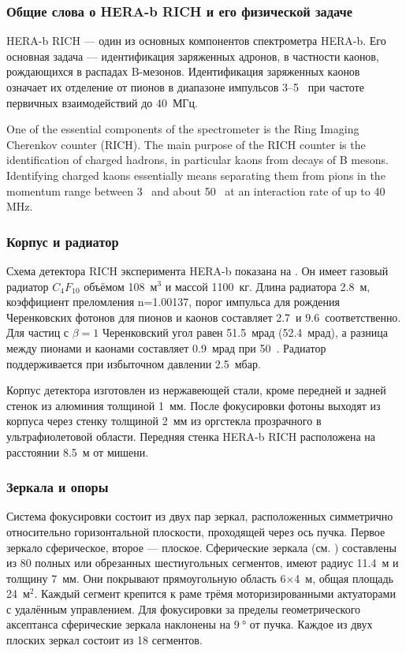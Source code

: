 \subsubsection{Общие слова о HERA-b RICH и его физической задаче}

HERA-b RICH --- один из основных компонентов спектрометра HERA-b. Его основная задача --- идентификация заряженных адронов, в частности каонов, рождающихся в распадах B-мезонов. Идентификация заряженных каонов означает их отделение от пионов в диапазоне импульсов 3--5~\GeVoverC{} при частоте первичных взаимодействий до 40~МГц.

One of the essential components of the spectrometer is the Ring Imaging Cherenkov counter (RICH). The main purpose of the RICH counter is the identification of charged hadrons, in particular kaons from decays of B mesons. Identifying charged kaons essentially means separating them from pions in the momentum range between 3~\GeVoverC{} and about 50~\GeVoverC{} at an interaction rate of up to 40 MHz.

\subsubsection{Корпус и радиатор}

Схема детектора RICH эксперимента HERA-b показана на . Он имеет газовый радиатор $C_{4}F_{10}$ объёмом 108~м$^3$ и массой 1100~кг. Длина радиатора 2.8~м, коэффициент преломления n=1.00137, порог импульса для рождения Черенковских фотонов для пионов и каонов составляет 2.7~\GeVoverC и 9.6~\GeVoverC соответственно. Для частиц с $\beta=1$ Черенковский угол равен 51.5~мрад (52.4~мрад), а разница между пионами и каонами составляет 0.9~мрад при 50~\GeVoverC. Радиатор поддерживается при избыточном давлении 2.5~мбар.

Корпус детектора изготовлен из нержавеющей стали, кроме передней и задней стенок из алюминия толщиной 1~мм. После фокусировки фотоны выходят из корпуса через стенку толщиной 2~мм из оргстекла прозрачного в ультрафиолетовой области. Передняя стенка HERA-b RICH расположена на расстоянии 8.5~м от мишени.

\subsubsection{Зеркала и опоры}

Система фокусировки состоит из двух пар зеркал, расположенных симметрично относительно горизонтальной плоскости, проходящей через ось пучка. Первое зеркало сферическое, второе --- плоское. Сферические зеркала (см. ) составлены из 80 полных или обрезанных шестиугольных сегментов, имеют радиус 11.4~м и толщину 7~мм. Они покрывают прямоугольную область 6$\times$4~м, общая площадь 24~м$^2$. Каждый сегмент крепится к раме трёмя моторизированными актуаторами с удалённым управлением. Для фокусировки за пределы геометрического аксептанса сферические зеркала наклонены на $\SI{9}{\degree}$ от пучка. Каждое из двух плоских зеркал состоит из 18 сегментов.

